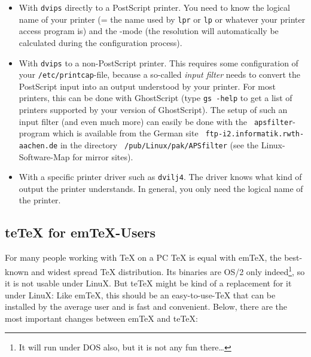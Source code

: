 \documentclass[12pt,a4paper]{article}
\newcommand{\teTeX}{\textrm{te}\TeX\xspace}
\newcommand{\Linux}{\textrm{Linu}\textsf{X}\xspace}
\begin{document}
\begin{itemize}
\item With {\tt dvips} directly to a PostScript printer. You
  need to know the logical name of your printer (= the name
  used by {\tt lpr} or {\tt lp} or whatever your printer
  access program is) and the \MF{}-mode (the resolution will
  automatically be calculated during the configuration
  process).
\item With {\tt dvips} to a non-PostScript printer. This
  requires some configuration of your
  \verb|/etc/printcap|-file, because a so-called \emph{input
    filter} needs to convert the PostScript input into an
  output understood by your printer. For most printers, this
  can be done with GhostScript (type {\tt gs -help} to get a
  list of printers supported by your version of
  GhostScript). The setup of such an input filter (and even
  much more) can easily be done with the {\tt
    apsfilter}-program which is available from the German site {\tt
    ftp-i2.informatik.rwth-aachen.de} in the directory {\tt
    /pub/Linux/pak/APSfilter} (see the
  Linux-Software-Map for mirror sites).
\item With a specific printer driver such as {\tt dvilj4}.
  The driver knows what kind of output the printer
  understands. In general, you only need the logical name of
  the printer.
\end{itemize}


\subsection{\teTeX{} for em\TeX{}-Users}
\label{ssec:tet}

For many people working with \TeX{} on a PC \TeX{} is equal
with em\TeX{}, the best-known and widest spread \TeX{}
distribution. Its binaries are OS/2 only indeed\footnote{It
  will run under DOS also, but it is not any fun
  there\dots}, so it is not usable under \Linux{}. But
\teTeX{} might be kind of a replacement for it under
\Linux{}: Like em\TeX{}, this should be an easy-to-use-\TeX{}
that can be installed by the average user and is fast and
convenient. Below, there are the most important changes
between em\TeX{} and \teTeX{}:
\end{document}
